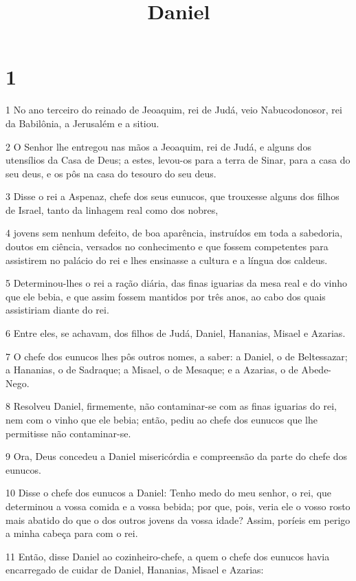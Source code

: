 

\title{Daniel}


\chapter{1}

\par 1 No ano terceiro do reinado de Jeoaquim, rei de Judá, veio Nabucodonosor, rei da Babilônia, a Jerusalém e a sitiou.
\par 2 O Senhor lhe entregou nas mãos a Jeoaquim, rei de Judá, e alguns dos utensílios da Casa de Deus; a estes, levou-os para a terra de Sinar, para a casa do seu deus, e os pôs na casa do tesouro do seu deus.
\par 3 Disse o rei a Aspenaz, chefe dos seus eunucos, que trouxesse alguns dos filhos de Israel, tanto da linhagem real como dos nobres,
\par 4 jovens sem nenhum defeito, de boa aparência, instruídos em toda a sabedoria, doutos em ciência, versados no conhecimento e que fossem competentes para assistirem no palácio do rei e lhes ensinasse a cultura e a língua dos caldeus.
\par 5 Determinou-lhes o rei a ração diária, das finas iguarias da mesa real e do vinho que ele bebia, e que assim fossem mantidos por três anos, ao cabo dos quais assistiriam diante do rei.
\par 6 Entre eles, se achavam, dos filhos de Judá, Daniel, Hananias, Misael e Azarias.
\par 7 O chefe dos eunucos lhes pôs outros nomes, a saber: a Daniel, o de Beltessazar; a Hananias, o de Sadraque; a Misael, o de Mesaque; e a Azarias, o de Abede-Nego.
\par 8 Resolveu Daniel, firmemente, não contaminar-se com as finas iguarias do rei, nem com o vinho que ele bebia; então, pediu ao chefe dos eunucos que lhe permitisse não contaminar-se.
\par 9 Ora, Deus concedeu a Daniel misericórdia e compreensão da parte do chefe dos eunucos.
\par 10 Disse o chefe dos eunucos a Daniel: Tenho medo do meu senhor, o rei, que determinou a vossa comida e a vossa bebida; por que, pois, veria ele o vosso rosto mais abatido do que o dos outros jovens da vossa idade? Assim, poríeis em perigo a minha cabeça para com o rei.
\par 11 Então, disse Daniel ao cozinheiro-chefe, a quem o chefe dos eunucos havia encarregado de cuidar de Daniel, Hananias, Misael e Azarias:
